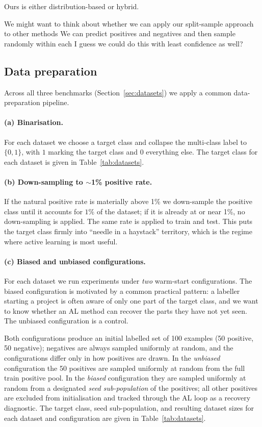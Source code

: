 \documentclass[11pt]{article}
\begin{document}
Ours is either distribution-based or hybrid. 



We might want to think about whether we can apply our split-sample approach to other methods 
We can predict positives and negatives and then sample randomly within each 
I guess we could do this with least confidence as well? 



\subsection{Data preparation}
\label{sec:datapprep}

Across all three benchmarks (Section~\ref{sec:datasets}) we apply a common data-preparation pipeline.

\paragraph{(a) Binarisation.} For each dataset we choose a target class and collapse the multi-class label to $\{0, 1\}$, with $1$ marking the target class and $0$ everything else. The target class for each dataset is given in Table~\ref{tab:datasets}.

\paragraph{(b) Down-sampling to $\sim$1\% positive rate.} If the natural positive rate is materially above 1\% we down-sample the positive class until it accounts for $1\%$ of the dataset; if it is already at or near 1\%, no down-sampling is applied. The same rate is applied to train and test. This puts the target class firmly into ``needle in a haystack'' territory, which is the regime where active learning is most useful.

\paragraph{(c) Biased and unbiased configurations.} For each dataset we run experiments under \emph{two} warm-start configurations. The biased configuration is motivated by a common practical pattern: a labeller starting a project is often aware of only one part of the target class, and we want to know whether an AL method can recover the parts they have not yet seen. The unbiased configuration is a control.

Both configurations produce an initial labelled set of 100 examples (50 positive, 50 negative); negatives are always sampled uniformly at random, and the configurations differ only in how positives are drawn. In the \emph{unbiased} configuration the 50 positives are sampled uniformly at random from the full train positive pool. In the \emph{biased} configuration they are sampled uniformly at random from a designated \emph{seed sub-population} of the positives; all other positives are excluded from initialisation and tracked through the AL loop as a recovery diagnostic. The target class, seed sub-population, and resulting dataset sizes for each dataset and configuration are given in Table~\ref{tab:datasets}.
\end{document}
